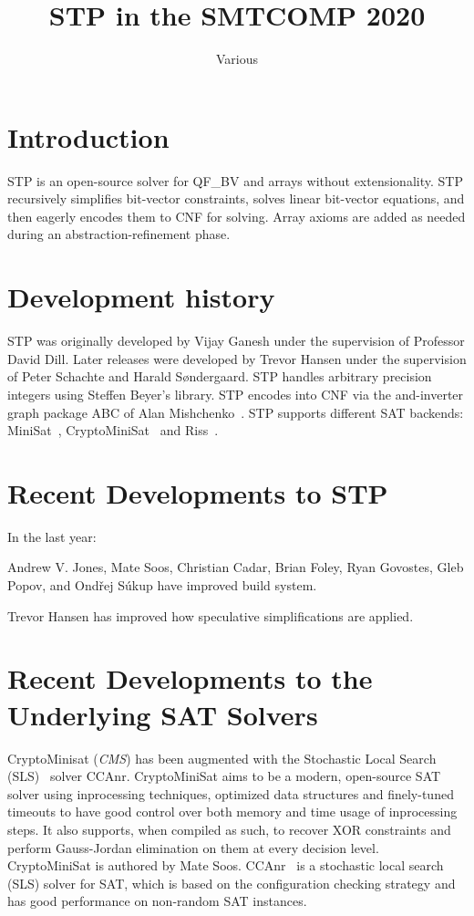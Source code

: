 \documentclass{easychair}
\begin{document}
\title{STP in the SMTCOMP 2020}
\author{Various}
\institute{}

\maketitle
\thispagestyle{empty}
\pagestyle{empty}

\section{Introduction}
STP\cite{Vijay:Thesis:2007} is an open-source solver for QF\_BV and arrays without extensionality. 
STP recursively simplifies bit-vector constraints, solves linear bit-vector equations, and then eagerly encodes them to CNF for solving. 
Array axioms are added as needed during an abstraction-refinement phase.

\section{Development history}
STP was originally developed by Vijay Ganesh under the supervision of Professor David Dill. 
Later releases were developed by Trevor Hansen under the supervision of Peter Schachte and Harald Søndergaard. 
STP handles arbitrary precision integers using Steffen Beyer's library. 
STP encodes into CNF via the and-inverter graph package ABC of Alan Mishchenko~\cite{Brayton:2010:AAI:2144310.2144317}.
STP supports different SAT backends: MiniSat~\cite{MiniSat:github}, CryptoMiniSat~\cite{CMS:github} and Riss~\cite{Riss:github}.

\section{Recent Developments to STP}
In the last year:

Andrew V. Jones, Mate Soos, Christian Cadar, Brian Foley, Ryan Govostes, Gleb Popov, and Ondřej Súkup have improved build system. 

Trevor Hansen has improved how speculative simplifications are applied.

\section{Recent Developments to the Underlying SAT Solvers}
CryptoMinisat (\emph{CMS}) has been augmented with the Stochastic Local Search (SLS)~\cite{DBLP:conf/sat/CaiLS15} solver CCAnr. 
CryptoMiniSat aims to be a modern, open-source SAT solver using inprocessing techniques, optimized data structures and finely-tuned timeouts to have good control over both memory and time usage of inprocessing steps. It also supports, when compiled as such, to recover XOR constraints and perform Gauss-Jordan elimination on them at every decision level. CryptoMiniSat is authored by Mate Soos. CCAnr~\cite{DBLP:conf/sat/CaiLS15} is a stochastic local search (SLS) solver for SAT, which is based on the configuration checking strategy and has good performance on non-random SAT instances. 
\end{document}
